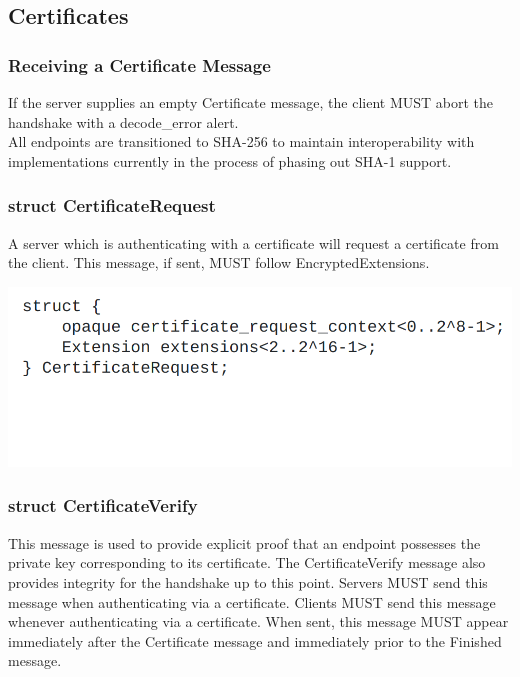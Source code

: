 \documentclass{article}
\begin{document}
\subsection{Certificates}


\subsubsection{Receiving a Certificate Message}

If the server supplies an empty Certificate message, the client MUST
   abort the handshake with a decode\_error alert.\\

All endpoints are transitioned to SHA-256 to maintain interoperability
with implementations currently in the process of phasing out SHA-1 support.

\subsubsection{struct CertificateRequest}
A server which is authenticating with a certificate will
   request a certificate from the client.  This message, if sent, MUST
   follow EncryptedExtensions.

   \begin{center}
       \includegraphics[width=0.75\columnwidth]{media/CertRequest.png}
\end{center}


\subsubsection{struct CertificateVerify}
This message is used to provide explicit proof that an endpoint
   possesses the private key corresponding to its certificate.  The
   CertificateVerify message also provides integrity for the handshake
   up to this point.  Servers MUST send this message when authenticating
   via a certificate.  Clients MUST send this message whenever
   authenticating via a certificate.  When sent, this message MUST appear immediately after
   the Certificate message and immediately prior to the Finished
   message.
\end{document}
